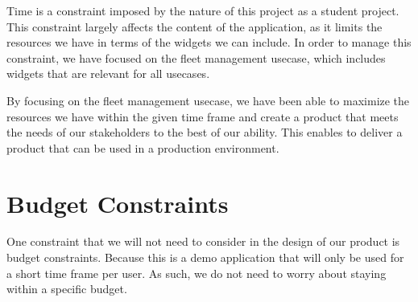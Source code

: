 Time is a constraint imposed by the nature of this project as a student project. This constraint largely affects the content of the application, as it limits the resources we have in terms of the \glspl{widget} we can include. In order to manage this constraint, we have focused on the fleet management \gls{usecase}, which includes \glspl{widget} that are relevant for all \glspl{usecase}.

By focusing on the fleet management \gls{usecase}, we have been able to maximize the resources we have within the given time frame and create a product that meets the needs of our \glspl{stakeholder} to the best of our ability. This enables to deliver a product that can be used in a production environment.



\section{Budget Constraints}

One constraint that we will not need to consider in the design of our product is budget constraints. Because this is a demo application that will only be used for a short time frame per user. As such, we do not need to worry about staying within a specific budget.